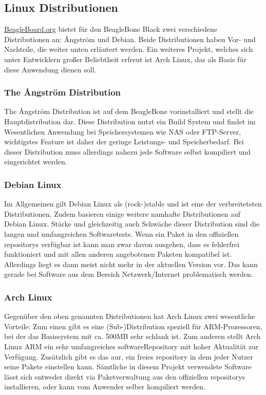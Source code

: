 \documentclass[thesis.tex]{subfiles}
\begin{document}
\subsection{Linux Distributionen}
\href{http://beagleboard.org/}{BeagleBoard.org} bietet für den BeagleBone Black zwei verschiedene Distributionen an: {\AA}ngström und Debian. Beide Distributionen haben Vor- und Nachteile, die weiter unten erläutert werden. Ein weiteres Projekt, welches sich unter Entwicklern großer Beliebtheit erfreut ist Arch Linux, das als Basis für diese Anwendung dienen soll.

\subsubsection{The {\AA}ngström Distribution}
The {\AA}ngström Distribution ist auf dem BeagleBone vorinstalliert und stellt die Hauptdistribution dar. Diese Distribution nutzt ein Build System und findet im Wesentlichen Anwendung bei Speichersystemen wie NAS oder FTP-Server, wichtigstes Feature ist daher der geringe Leistungs- und Speicherbedarf. Bei dieser Distribution muss allerdings nahezu jede Software selbst kompiliert und eingerichtet werden.

\subsubsection{Debian Linux}
Im Allgemeinen gilt Debian Linux als (rock-)stable und ist eine der verbreitetsten Distributionen. Zudem basieren einige weitere namhafte Distributionen auf Debian Linux. Stärke und gleichzeitig auch Schwäche dieser Distribution sind die langen und umfangreichen Softwaretests. Wenn ein Paket in den offiziellen \glspl{repository} verfügbar ist kann man zwar davon ausgehen, dass es fehlerfrei funktioniert und mit allen anderen angebotenen Paketen kompatibel ist. Allerdings liegt es dann meist nicht mehr in der aktuellen Version vor. Das kann gerade bei Software aus dem Bereich Netzwerk/Internet problematisch werden.

\subsubsection{Arch Linux}
Gegenüber den oben genannten Distributionen hat Arch Linux zwei wesentliche Vorteile: Zum einen gibt es eine (Sub-)Distribution speziell für ARM-Prozessoren, bei der das Basissystem mit ca. 500MB sehr schlank ist. Zum anderen stellt Arch Linux ARM ein sehr umfangreiches \gls{softwareRepository} mit hoher Aktualität zur Verfügung. Zusätzlich gibt es das \gls{aur}, ein freies \gls{repository} in dem jeder Nutzer seine Pakete einstellen kann. Sämtliche in diesem Projekt verwendete Software lässt sich entweder direkt via Paketverwaltung aus den offiziellen \glspl{repository} installieren, oder kann vom Anwender selber kompiliert werden.
\end{document}

